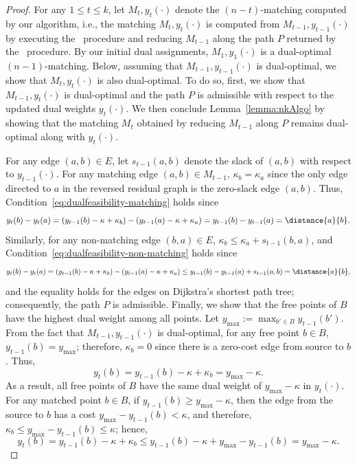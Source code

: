 \nkAlgo*
\begin{proof}
For any $1\le t\le k$, let $M_t, y_t(\cdot)$ denote the $(n-t)$-matching computed by our algorithm, i.e., the matching $M_t, y_t(\cdot)$ is computed from $M_{t-1}, y_{t-1}(\cdot)$ by executing the \reverse\ procedure and reducing $M_{t-1}$ along the path $P$ returned by the \reverse\ procedure.
By our initial dual assignments, $M_1, y_1(\cdot)$ is a dual-optimal $(n-1)$-matching. Below, assuming that $M_{t-1}, y_{t-1}(\cdot)$ is dual-optimal, we show that $M_{t}, y_{t}(\cdot)$ is also dual-optimal. To do so, first, we show that $M_{t-1}, y_t(\cdot)$ is dual-optimal and the path $P$ is admissible with respect to the updated dual weights $y_t(\cdot)$. We then conclude Lemma~\ref{lemma:nkAlgo} by showing that the matching $M_t$ obtained by reducing $M_{t-1}$ along $P$ remains dual-optimal along with $y_t(\cdot)$.

For any edge $(a,b)\in E$, let $s_{t-1}(a,b)$ denote the slack of $(a,b)$ with respect to $y_{t-1}(\cdot)$. For any matching edge $(a,b)\in M_{t-1}$, $\kappa_b = \kappa_a$ since the only edge directed to $a$ in the reversed residual graph is the zero-slack edge $(a,b)$. Thus, Condition~\eqref{eq:dualfeasibility-matching} holds since
\begin{equation*}\label{eq:hung-0}
y_t(b) - y_t(a) = (y_{t-1}(b)-\kappa+\kappa_b) - (y_{t-1}(a)-\kappa+\kappa_a) = y_{t-1}(b)-y_{t-1}(a) = \distance{a}{b}.
\end{equation*}
Similarly, for any non-matching edge $(b,a)\in E$, $\kappa_b\le \kappa_a + s_{t-1}(b,a)$, and Condition~\eqref{eq:dualfeasibility-non-matching} holds since
\begin{equation*}
    y_t(b) - y_t(a) = (y_{t-1}(b)-\kappa+\kappa_b) - (y_{t-1}(a)-\kappa+\kappa_a) \le y_{t-1}(b)-y_{t-1}(a) + s_{t-1}(a,b) = \distance{a}{b}, 
\end{equation*}
and the equality holds for the edges on Dijkstra's shortest path tree; consequently, the path $P$ is admissible.
Finally, we show that the free points of $B$ have the highest dual weight among all points. Let $y_{\max}:=\max_{b'\in B}y_{t-1}(b')$. From the fact that $M_{t-1}, y_{t-1}(\cdot)$ is dual-optimal, for any free point $b\in B$, $y_{t-1}(b)=y_{\max}$; therefore, $\kappa_b=0$ since there is a zero-cost edge from source to $b$. Thus, 
\begin{equation}\label{eq:hung-2}
y_t(b) = y_{t-1}(b) - \kappa + \kappa_b = y_{\max} - \kappa.
\end{equation}
As a result, all free points of $B$ have the same dual weight of $y_{\max} - \kappa$ in $y_t(\cdot)$.
For any matched point $b\in B$, if $y_{t-1}(b)\ge y_{\max} - \kappa$, then the edge from the source to $b$ has a cost $y_{\max} - y_{t-1}(b)<\kappa$, and therefore, $\kappa_b\le y_{\max} - y_{t-1}(b)\le \kappa$; hence, 
\[y_t(b) = y_{t-1}(b)-\kappa+\kappa_b\le y_{t-1}(b)-\kappa+y_{\max}-y_{t-1}(b) = y_{\max}-\kappa.\]


\end{proof}
